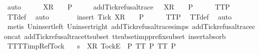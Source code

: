%
\endisadelimproof
%
\isatagproof
{}\isamarkupfalse%
\ auto\isanewline
\ \ \isamarkupfalse%
\ {\isachardoublequoteopen}{\isasymrho}\ {\isacharat}\ {\isacharbrackleft}X{\isacharbrackright}\isactrlsub R\ {\isacharhash}\ {\isasymsigma}\ {\isasymin}\ P{\isachardoublequoteclose}\isanewline
\ \ \isamarkupfalse%
\ \isamarkupfalse%
\ {\isachardoublequoteopen}add{\isacharunderscore}Tick{\isacharunderscore}refusal{\isacharunderscore}trace\ {\isacharparenleft}{\isasymrho}\ {\isacharat}\ {\isacharbrackleft}X{\isacharbrackright}\isactrlsub R\ {\isacharhash}\ {\isasymsigma}{\isacharparenright}\ {\isasymin}\ P{\isachardoublequoteclose}\isanewline
\ \ \ \ \isamarkupfalse%
\ TT{}{\isacharunderscore}P\ \isamarkupfalse%
\ TT{}{\isacharunderscore}def\ \isamarkupfalse%
\ auto\isanewline
\ \ \isamarkupfalse%
\ \isamarkupfalse%
\ {\isachardoublequoteopen}{\isasymrho}\ {\isacharat}\ {\isacharbrackleft}insert\ Tick\ X{\isacharbrackright}\isactrlsub R\ {\isacharhash}\ {\isasymsigma}\ {\isasymin}\ P{\isachardoublequoteclose}\isanewline
\ \ \ \ \isamarkupfalse%
\ TT{}{\isacharunderscore}P\ \isamarkupfalse%
\ TT{}{\isacharunderscore}def\ \isamarkupfalse%
\ auto\isanewline
\ \ \ \ \isamarkupfalse%
\ {\isacharparenleft}metis\ Un{\isacharunderscore}insert{\isacharunderscore}left\ Un{\isacharunderscore}insert{\isacharunderscore}right\ add{\isacharunderscore}Tick{\isacharunderscore}refusal{\isacharunderscore}trace{\isachardot}simps{\isacharparenleft}{}{\isacharparenright}\ add{\isacharunderscore}Tick{\isacharunderscore}refusal{\isacharunderscore}trace{\isacharunderscore}concat\ add{\isacharunderscore}Tick{\isacharunderscore}refusal{\isacharunderscore}trace{\isacharunderscore}tt{\isacharunderscore}subset\ tt{\isacharunderscore}subset{\isacharunderscore}imp{\isacharunderscore}prefix{\isacharunderscore}subset\ insert{\isacharunderscore}absorb{}{\isacharparenright}\isanewline
{}\isamarkupfalse%
%
\endisatagproof
{\isafoldproof}%
%
\isadelimproof
\isanewline
%
\endisadelimproof
\isanewline
{}\isamarkupfalse%
\ TT{}{\isacharunderscore}TT{}{\isacharunderscore}imp{\isacharunderscore}Ref{\isacharunderscore}Tock{\isacharcolon}\isanewline
\ \ \ {\isachardoublequoteopen}s\ {\isacharat}\ {\isacharbrackleft}{\isacharbrackleft}X{\isacharbrackright}\isactrlsub R{\isacharcomma}\ {\isacharbrackleft}Tock{\isacharbrackright}\isactrlsub E{\isacharbrackright}\ {\isasymin}\ P{\isachardoublequoteclose}\ {\isachardoublequoteopen}TT{}\ P{\isachardoublequoteclose}\ {\isachardoublequoteopen}TT{}\ P{\isachardoublequoteclose}\isanewline
